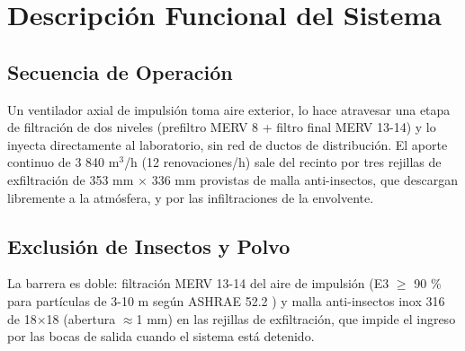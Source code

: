\section{Descripción Funcional del Sistema}

\subsection{Secuencia de Operación}

Un ventilador axial de impulsión toma aire exterior, lo hace atravesar una etapa de filtración de dos niveles (prefiltro MERV 8 + filtro final MERV 13-14) y lo inyecta directamente al laboratorio, sin red de ductos de distribución. El aporte continuo de 3 840 m$^3$/h (12 renovaciones/h) sale del recinto por tres rejillas de exfiltración de 353 mm $\times$ 336 mm provistas de malla anti-insectos, que descargan libremente a la atmósfera, y por las infiltraciones de la envolvente.

\subsection{Exclusión de Insectos y Polvo}

La barrera es doble: filtración MERV 13-14 del aire de impulsión (E3 $\geq$ 90 \% para partículas de 3-10 \textmu m según ASHRAE 52.2 \cite{ashrae522_2017}) y malla anti-insectos inox 316 de 18$\times$18 (abertura $\approx$1 mm) en las rejillas de exfiltración, que impide el ingreso por las bocas de salida cuando el sistema está detenido.
